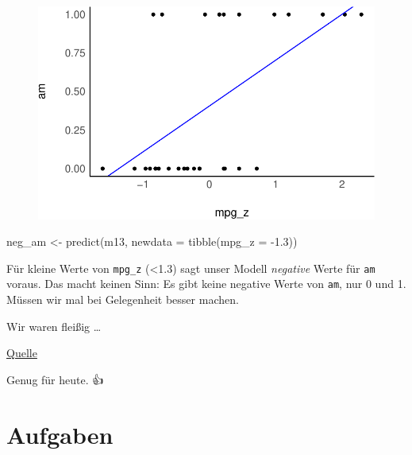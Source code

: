 \documentclass[
  a4paper,
  DIV=11]{scrreprt}
\newenvironment{Shaded}{\begin{snugshade}}{\end{snugshade}}
\newcommand{\AttributeTok}[1]{\textcolor[rgb]{0.40,0.45,0.13}{#1}}
\newcommand{\FloatTok}[1]{\textcolor[rgb]{0.68,0.00,0.00}{#1}}
\newcommand{\FunctionTok}[1]{\textcolor[rgb]{0.28,0.35,0.67}{#1}}
\newcommand{\NormalTok}[1]{\textcolor[rgb]{0.00,0.23,0.31}{#1}}
\newcommand{\OtherTok}[1]{\textcolor[rgb]{0.00,0.23,0.31}{#1}}
\newcommand{\SpecialCharTok}[1]{\textcolor[rgb]{0.37,0.37,0.37}{#1}}
\theoremstyle{definition}
\theoremstyle{remark}
\begin{document}
\begin{figure}[H]

{\centering \includegraphics{./metrische-AV_files/figure-pdf/unnamed-chunk-54-1.pdf}

}

\end{figure}

\begin{Shaded}
\begin{Highlighting}[]
\NormalTok{neg\_am }\OtherTok{\textless{}{-}} \FunctionTok{predict}\NormalTok{(m13, }\AttributeTok{newdata =} \FunctionTok{tibble}\NormalTok{(}\AttributeTok{mpg\_z =} \SpecialCharTok{{-}}\FloatTok{1.3}\NormalTok{))}
\end{Highlighting}
\end{Shaded}

Für kleine Werte von \texttt{mpg\_z} (\textless1.3) sagt unser Modell
\emph{negative} Werte für \texttt{am} voraus. Das macht keinen Sinn: Es
gibt keine negative Werte von \texttt{am}, nur 0 und 1. Müssen wir mal
bei Gelegenheit besser machen.

Wir waren fleißig \ldots{}

\href{https://giphy.com/gifs/XIqCQx02E1U9W}{Quelle}

Genug für heute. 👍

\hypertarget{aufgaben-8}{%
\section{Aufgaben}\label{aufgaben-8}}
\end{document}
